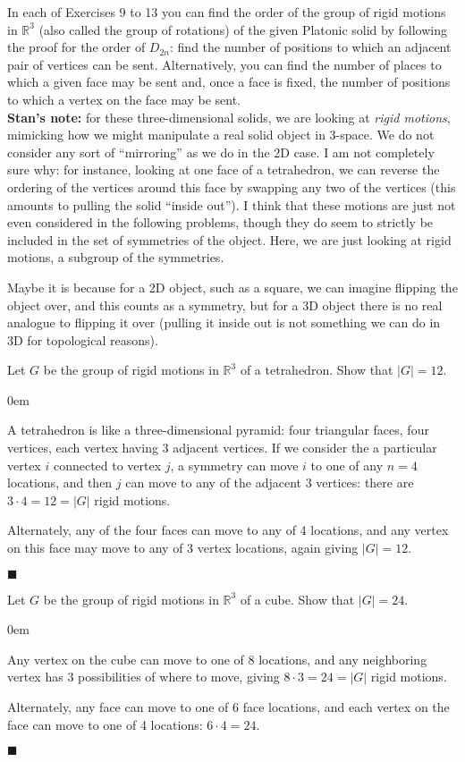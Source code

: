 \documentclass[12pt]{article}
\renewcommand{\qed}{\hfill$\blacksquare$}
\renewenvironment{proof}{\begin{addmargin}[1em]{0em}\begin{newproof}}{\end{newproof}\end{addmargin}\qed}
\newenvironment{problem}[2][Exercise]{\begin{trivlist}
\item[\hskip \labelsep {\bfseries #1}\hskip \labelsep {\bfseries #2.}]}{\end{trivlist}}
\begin{document}
In each of Exercises 9 to 13 you can find the order of the group of rigid motions in $\mathbb{R}^3$ (also called the group of rotations) of the given Platonic solid by following the proof for the order of $D_{2n}$: find the number of positions to which an adjacent pair of vertices can be sent. Alternatively, you can find the number of places to which a given face may be sent and, once a face is fixed, the number of positions to which a vertex on the face may be sent.\\

\textbf{Stan's note:} {\color{red}for these three-dimensional solids, we are looking at \textit{rigid motions}, mimicking how we might manipulate a real solid object in 3-space. We do not consider any sort of ``mirroring'' as we do in the 2D case. I am not completely sure why: for instance, looking at one face of a tetrahedron, we can reverse the ordering of the vertices around this face by swapping any two of the vertices (this amounts to pulling the solid ``inside out''). I think that these motions are just not even considered in the following problems, though they do seem to strictly be included in the set of symmetries of the object. Here, we are just looking at rigid motions, a subgroup of the symmetries.}

Maybe it is because for a 2D object, such as a square, we can imagine flipping the object over, and this counts as a symmetry, but for a 3D object there is no real analogue to flipping it over (pulling it inside out is not something we can do in 3D for topological reasons).

\begin{problem}{1.2.9}
Let $G$ be the group of rigid motions in $\mathbb{R}^3$ of a tetrahedron. Show that $\left|G\right|=12$.
\end{problem}
\begin{proof}
A tetrahedron is like a three-dimensional pyramid: four triangular faces, four vertices, each vertex having 3 adjacent vertices. If we consider the a particular vertex $i$ connected to vertex $j$, a symmetry can move $i$ to one of any $n=4$ locations, and then $j$ can move to any of the adjacent 3 vertices: there are $3\cdot 4=12 =\left|G\right|$ rigid motions.

Alternately, any of the four faces can move to any of 4 locations, and any vertex on this face may move to any of 3 vertex locations, again giving $\left|G\right|=12$.
\end{proof}

\begin{problem}{1.2.10}
Let $G$ be the group of rigid motions in $\mathbb{R}^3$ of a cube. Show that $\left|G\right|=24$.
\end{problem}
\begin{proof}
Any vertex on the cube can move to one of 8 locations, and any neighboring vertex has 3 possibilities of where to move, giving $8\cdot 3 = 24 =\left|G\right|$ rigid motions.

Alternately, any face can move to one of 6 face locations, and each vertex on the face can move to one of 4 locations: $6\cdot 4 = 24$.
\end{proof}
\end{document}
